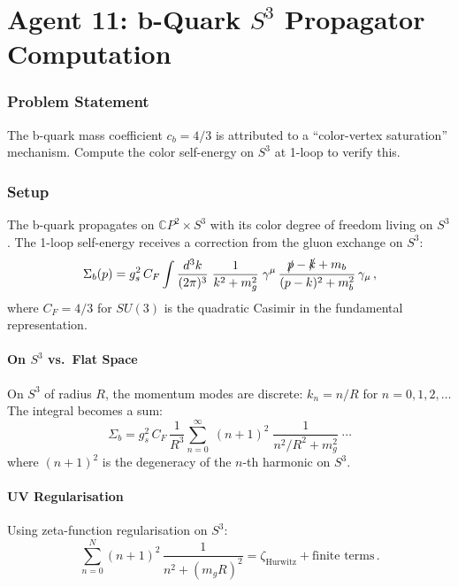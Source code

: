 \documentclass[11pt,a4paper]{article}
\newcommand{\CP}{\mathbb{C}P}
\begin{document}
\part{Agent 11: b-Quark $S^3$ Propagator Computation}
\label{part:bquark}

\section{Problem Statement}

The b-quark mass coefficient $c_b = 4/3$ is attributed to a ``color-vertex saturation'' mechanism. Compute the color self-energy on $S^3$ at 1-loop to verify this.

\section{Setup}

The b-quark propagates on $\CP^2 \times S^3$ with its color degree of freedom living on $S^3$. The 1-loop self-energy receives a correction from the gluon exchange on $S^3$:
\begin{equation}
\Sigma_b(p) = g_s^2\,C_F \int \frac{d^3k}{(2\pi)^3}\;\frac{1}{k^2 + m_g^2}\;\gamma^\mu\,\frac{\slashed{p} - \slashed{k} + m_b}{(p-k)^2 + m_b^2}\,\gamma_\mu\,,
\end{equation}
where $C_F = 4/3$ for $SU(3)$ is the quadratic Casimir in the fundamental representation.

\subsection{On $S^3$ vs.\ Flat Space}

On $S^3$ of radius $R$, the momentum modes are discrete: $k_n = n/R$ for $n = 0, 1, 2, \ldots$ The integral becomes a sum:
\begin{equation}
\Sigma_b = g_s^2\,C_F\,\frac{1}{R^3}\sum_{n=0}^{\infty}\;(n+1)^2\;\frac{1}{n^2/R^2 + m_g^2}\;\cdots
\end{equation}
where $(n+1)^2$ is the degeneracy of the $n$-th harmonic on $S^3$.

\subsection{UV Regularisation}

Using zeta-function regularisation on $S^3$:
\begin{equation}
\sum_{n=0}^{N} (n+1)^2\,\frac{1}{n^2 + (m_g R)^2} = \zeta_{\mathrm{Hurwitz}} + \text{finite terms}\,.
\end{equation}
\end{document}
